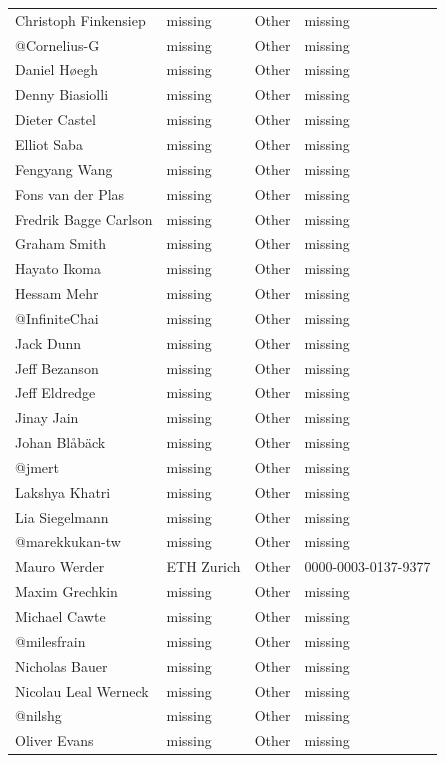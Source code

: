 \begin{longtable}{p{4cm}p{4cm}ll}
  Christoph Finkensiep & missing & Other & missing \\
  @Cornelius-G & missing & Other & missing \\
  Daniel Høegh & missing & Other & missing \\
  Denny Biasiolli & missing & Other & missing \\
  Dieter Castel & missing & Other & missing \\
  Elliot Saba & missing & Other & missing \\
  Fengyang Wang & missing & Other & missing \\
  Fons van der Plas & missing & Other & missing \\
  Fredrik Bagge Carlson & missing & Other & missing \\
  Graham Smith & missing & Other & missing \\
  Hayato Ikoma & missing & Other & missing \\
  Hessam Mehr & missing & Other & missing \\
  @InfiniteChai & missing & Other & missing \\
  Jack Dunn & missing & Other & missing \\
  Jeff Bezanson & missing & Other & missing \\
  Jeff Eldredge & missing & Other & missing \\
  Jinay Jain & missing & Other & missing \\
  Johan Blåbäck & missing & Other & missing \\
  @jmert & missing & Other & missing \\
  Lakshya Khatri & missing & Other & missing \\
  Lia Siegelmann & missing & Other & missing \\
  @marekkukan-tw & missing & Other & missing \\
  Mauro Werder & ETH Zurich & Other & 0000-0003-0137-9377 \\
  Maxim Grechkin & missing & Other & missing \\
  Michael Cawte & missing & Other & missing \\
  @milesfrain & missing & Other & missing \\
  Nicholas Bauer & missing & Other & missing \\
  Nicolau Leal Werneck & missing & Other & missing \\
  @nilshg & missing & Other & missing \\
  Oliver Evans & missing & Other & missing \\

\end{longtable}
